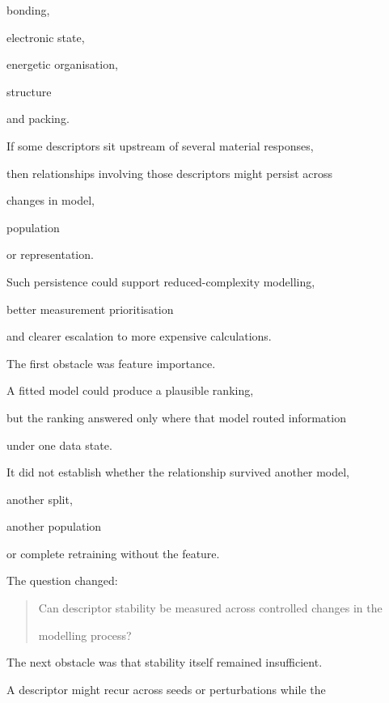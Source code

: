 \documentclass[11pt,a4paper,oneside]{report}
\begin{document}
bonding,

electronic state,

energetic organisation,

structure

and packing.



If some descriptors sit upstream of several material responses,

then relationships involving those descriptors might persist across

changes in model,

population

or representation.



Such persistence could support reduced-complexity modelling,

better measurement prioritisation

and clearer escalation to more expensive calculations.



The first obstacle was feature importance.



A fitted model could produce a plausible ranking,

but the ranking answered only where that model routed information

under one data state.



It did not establish whether the relationship survived another model,

another split,

another population

or complete retraining without the feature.



The question changed:



\begin{quote}



Can descriptor stability be measured across controlled changes in the

modelling process?



\end{quote}



The next obstacle was that stability itself remained insufficient.



A descriptor might recur across seeds or perturbations while the
\end{document}
